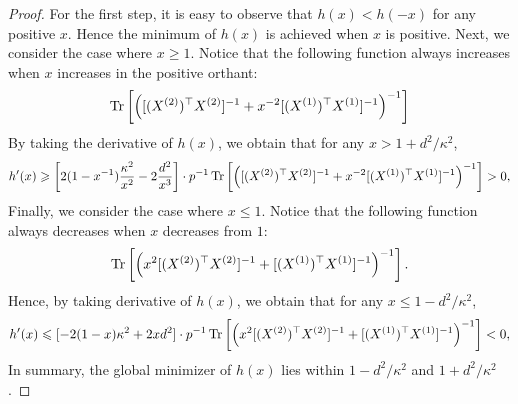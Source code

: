 \begin{proof}
For the first step, it is easy to observe that $h(x)< h(-x)$ for any positive $x$.
Hence the minimum of $h(x)$ is achieved when $x$ is positive.
Next, we consider the case where $x\ge 1$.
Notice that the following function always increases when $x$ increases in the positive orthant:
$$\operatorname{Tr}\left[\left([(X^{(2)})^\top X^{(2)}]^{-1} + x^{-2} [(X^{(1)})^\top X^{(1)}]^{-1}\right)^{-1}\right]$$
By taking the derivative of $h(x)$, we obtain that for any $x > 1+d^2/\kappa^2$,
\begin{align}\label{h'(A)1}
h'(x) \geqslant \left[2(1-x^{-1})\frac{\kappa^2}{x^2} - 2\frac{d^2}{x^3}\right] \cdot p^{-1} \operatorname{Tr}\left[\left([(X^{(2)})^\top X^{(2)}]^{-1} + x^{-2} [(X^{(1)})^\top X^{(1)}]^{-1}\right)^{-1}\right] > 0,
\end{align}
Finally, we consider the case where $x \le 1$. Notice that the following function always decreases when $x$ decreases from $1$:
$$\operatorname{Tr}\left[\left(x^2[(X^{(2)})^\top X^{(2)}]^{-1} +  [(X^{(1)})^\top X^{(1)}]^{-1}\right)^{-1}\right].$$
Hence, by taking derivative of $h(x)$, we obtain that for any $x\le 1-d^2/\kappa^2$,
\begin{align}\label{h'(A)2}
	h'(x)\leqslant [-2(1-x)\kappa^2 +2 xd^2] \cdot p^{-1} \operatorname{Tr}\left[\left(x^2[(X^{(2)})^\top X^{(2)}]^{-1} + [(X^{(1)})^\top X^{(1)}]^{-1}\right)^{-1}\right] < 0,
\end{align}
In summary, the global minimizer of $h(x)$ lies within $1-d^2/\kappa^2$ and $1+d^2/\kappa^2$.



\end{proof}
